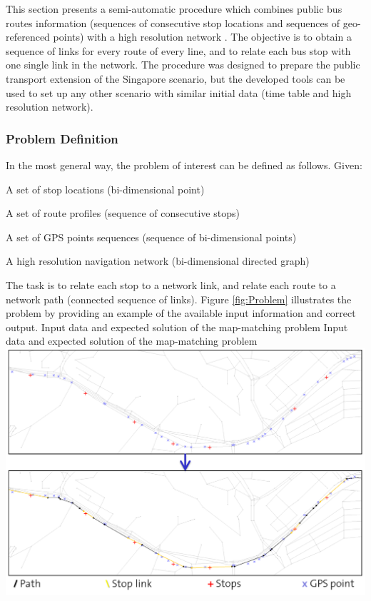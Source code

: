 This section presents a semi-automatic procedure which combines public bus routes information (sequences of consecutive stop locations and sequences of geo-referenced points) with a high resolution network \citep[][]{Ordonez_HKSTS_2011}. The objective is to obtain a sequence of links for every route of every line, and to relate each bus stop with one single link in the network. The procedure was designed to prepare the public transport extension of the Singapore scenario, but the developed tools can be used to set up any other scenario with similar initial data (time table and high resolution network).

\subsubsection{Problem Definition}
In the most general way, the problem of interest can be defined as follows. Given:
%
\begin{compactitem}
\item A set of stop locations (bi-dimensional point)
\item A set of route profiles (sequence of consecutive stops)
\item A set of GPS points sequences (sequence of bi-dimensional points)
\item A high resolution navigation network (bi-dimensional directed graph)
\end{compactitem}
%
The task is to relate each stop to a network link, and relate each route to a network path (connected sequence of links). Figure \ref{fig:Problem} illustrates the problem by providing an example of the available input information and correct output.
%
\createfigure
{Input data and expected solution of the map-matching problem}
{Input data and expected solution of the map-matching problem}
{\label{fig:Problem}}
{\includegraphics[width=1.0\textwidth]{extending/figures/semiAuto/Problem.png}}
{}

